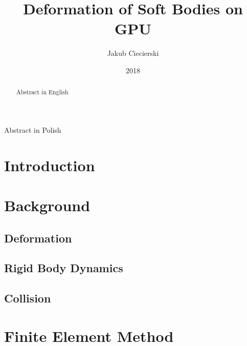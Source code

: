 \documentclass[en]{minipw} %
\title{Deformation of Soft Bodies on GPU} %
\author{Jakub Ciecierski}
\date{2018}
\begin{document}
\sloppy







\setcounter{page}{1}


\begin{abstract}

Abstract in English

\end{abstract}


\begin{streszczenie}

Abstract in Polish


\end{streszczenie}


\makestatement


\cleardoublepage
\tableofcontents


\cleardoublepage
\pagestyle{fancy}

\chapter*{Introduction}

\chapter{Background}

\section{Deformation}
\section{Rigid Body Dynamics}
\section{Collision}

\chapter{Finite Element Method}
\end{document}
